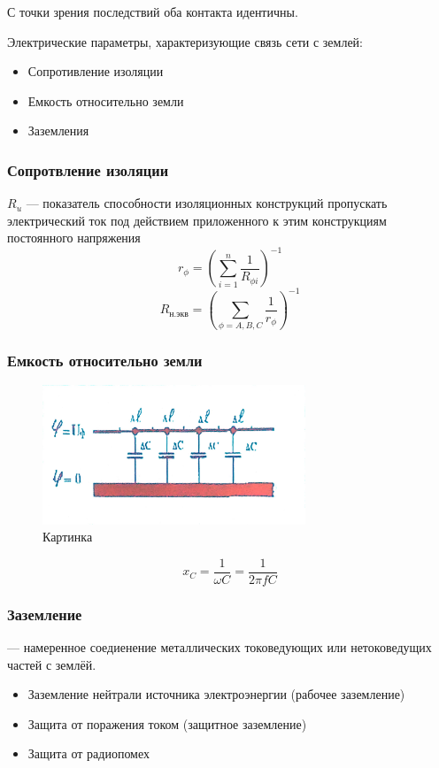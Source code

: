 \documentclass[a4paper, 14pt]{extarticle}
\begin{document}
С точки зрения последствий оба контакта идентичны.

Электрические параметры, характеризующие связь сети с землей:
\begin{itemize}
    \item Сопротивление изоляции
    \item Емкость относительно земли
    \item Заземления
\end{itemize}
\subsubsection*{Сопротвление изоляции}
$R_u$ --- показатель способности изоляционных конструкций пропускать электрический ток под действием приложенного к этим конструкциям постоянного напряжения
\begin{equation}
r_\phi = {\left( \sum\limits^{n}_{i=1} \dfrac{1}{R_{\phi i}} \right)}^{-1}
\end{equation}
\begin{equation}
    R_{\text{н.экв}} = {\left( \sum\limits_{\phi = A,B,C } \dfrac{1}{r_\phi} \right)}^{-1}
\end{equation}

\subsubsection*{Емкость относительно земли}

\begin{figure}[h]
    \centering
    \includegraphics[width=0.7\textwidth]{./img/L2/S003.jpg}
    \caption{Картинка}%
    \label{img:l2:3}
\end{figure}

\begin{equation}
    x_C = \frac{1}{\omega C} = \frac{1}{2\pi f C}  
\end{equation}

\subsubsection*{Заземление}
 --- намеренное соедиенение металлических токоведующих или нетоковедущих частей с землёй.
\begin{itemize}
    \item Заземление нейтрали источника электроэнергии (рабочее заземление)
    \item Защита от поражения током (защитное заземление)
    \item Защита от радиопомех
\end{itemize}
\end{document}
